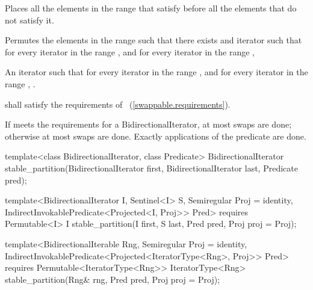 \begin{itemdescr}
\pnum
\begin{removedblock}
\effects Places all the elements in the range  that satisfy
 before all the elements that do not satisfy it.
\end{removedblock}

\begin{addedblock}
\effects Permutes the elements in the range  such that there exists and iterator 
such that for every iterator  in the range 
, and for every iterator  in the
range , 
\end{addedblock}

\pnum
\returns An iterator  such that for every iterator  in the range 
,
and for every iterator  in the range ,
.

\begin{removedblock}
\pnum
\requires
{} shall satisfy the requirements of
~(\ref{swappable.requirements}).
\end{removedblock}

\pnum
\complexity If  meets the requirements for a BidirectionalIterator, at most
 swaps are done; otherwise at most  swaps
are done. Exactly  applications of the predicate are done.
\end{itemdescr}

%
\begin{removedblock}
\begin{itemdecl}
template<class BidirectionalIterator, class Predicate>
  BidirectionalIterator
    stable_partition(BidirectionalIterator first,
                     BidirectionalIterator last, Predicate pred);
\end{itemdecl}
\end{removedblock}
\begin{addedblock}
\begin{itemdecl}
template<BidirectionalIterator I, Sentinel<I> S, Semiregular Proj = identity,
    IndirectInvokablePredicate<Projected<I, Proj>> Pred>
  requires Permutable<I>
  I stable_partition(I first, S last, Pred pred, Proj proj = Proj{});

template<BidirectionalIterable Rng, Semiregular Proj = identity,
    IndirectInvokablePredicate<Projected<IteratorType<Rng>, Proj>> Pred>
  requires Permutable<IteratorType<Rng>>
  IteratorType<Rng>
    stable_partition(Rng& rng, Pred pred, Proj proj = Proj{});
\end{itemdecl}
\end{addedblock}


